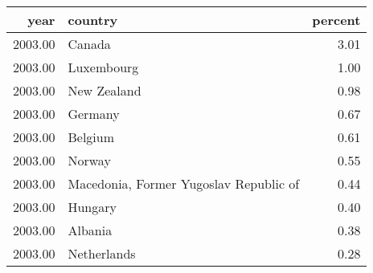 \begin{table}[ht]
\centering
\begin{tabular}{rlr}
  \hline
year & country & percent \\ 
  \hline
2003.00 & Canada & 3.01 \\ 
  2003.00 & Luxembourg & 1.00 \\ 
  2003.00 & New Zealand & 0.98 \\ 
  2003.00 & Germany & 0.67 \\ 
  2003.00 & Belgium & 0.61 \\ 
  2003.00 & Norway & 0.55 \\ 
  2003.00 & Macedonia, Former Yugoslav Republic of & 0.44 \\ 
  2003.00 & Hungary & 0.40 \\ 
  2003.00 & Albania & 0.38 \\ 
  2003.00 & Netherlands & 0.28 \\ 
   \hline
\end{tabular}
\end{table}
